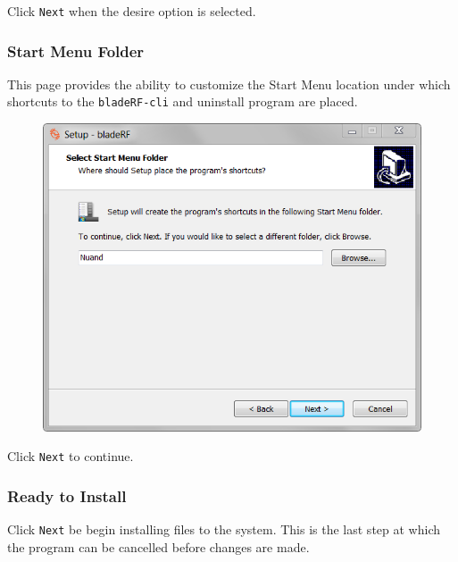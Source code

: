 {Click \texttt{Next} when the desire option is selected.

\newpage
\subsubsection{Start Menu Folder}

This page provides the ability to customize the Start Menu location
under which shortcuts to the \texttt{bladeRF-cli} and uninstall program
are placed.

\begin{figure}[h]
  \centering
  \includegraphics{images/windows/installer/06-startmenu.png}
\end{figure}

Click \texttt{Next} to continue.

\newpage
\subsubsection{Ready to Install}

Click \texttt{Next} be begin installing files to the system. This
is the last step at which the program can be cancelled before
changes are made.

}
